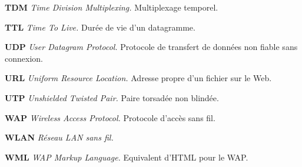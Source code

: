 \textbf{TDM} \textit{Time Division Multiplexing.} Multiplexage temporel.



\textbf{TTL} \textit{Time To Live.} Durée de vie d’un datagramme.



\textbf{UDP} \textit{User Datagram Protocol.} Protocole de transfert de données non fiable sans connexion.



\textbf{URL} \textit{Uniform Resource Location.} Adresse propre d’un fichier sur le Web.



\textbf{UTP} \textit{Unshielded Twisted Pair.} Paire torsadée non blindée.



\textbf{WAP} \textit{Wireless Access Protocol.} Protocole d’accès sans fil.



\textbf{WLAN} \textit{Réseau LAN sans fil.}



\textbf{WML} \textit{WAP Markup Language.} Equivalent d’HTML pour le WAP.